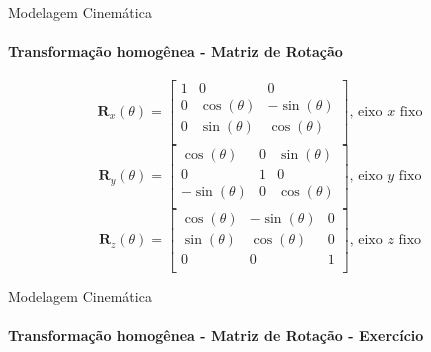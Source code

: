 \documentclass{beamer}
\begin{document}
\begin{frame}{Modelagem Cinemática}
    \framesubtitle{Transformação homogênea - Matriz de Rotação}
    \begin{block}{}
        \begin{equation*}
            \mathbf{R}_x(\theta) =
            \begin{bmatrix}
                1 & 0            & 0             \\
                0 & \cos(\theta) & -\sin(\theta) \\
                0 & \sin(\theta) & \cos(\theta)  \\
            \end{bmatrix} \text{, eixo $x$ fixo}
        \end{equation*}
        \begin{equation*}
            \mathbf{R}_y(\theta) =
            \begin{bmatrix}
                \cos(\theta)  & 0 & \sin(\theta) \\
                0             & 1 & 0            \\
                -\sin(\theta) & 0 & \cos(\theta) \\
            \end{bmatrix} \text{, eixo $y$ fixo}
        \end{equation*}
        \begin{equation*}
            \mathbf{R}_z(\theta) =
            \begin{bmatrix}
                \cos(\theta) & -\sin(\theta) & 0 \\
                \sin(\theta) & \cos(\theta) & 0 \\
                0            & 0            & 1 \\
            \end{bmatrix} \text{, eixo $z$ fixo}
        \end{equation*}
    \end{block}
\end{frame}

\begin{frame}{Modelagem Cinemática}
    \framesubtitle{Transformação homogênea - Matriz de Rotação - Exercício}

    
\end{frame}
\end{document}
